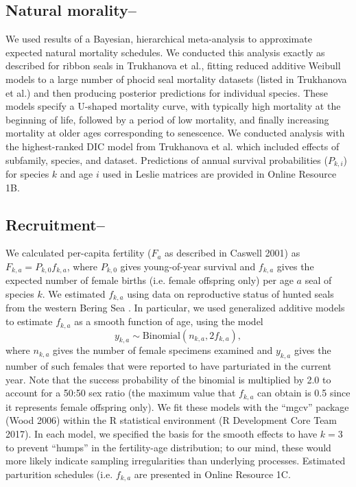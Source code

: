 \documentclass{svjour3}
\begin{document}
\subsection*{Natural morality--}
	We used results of a Bayesian, hierarchical meta-analysis \citep{TrukhanovaEtAl2018} to approximate expected natural mortality schedules.  We conducted this analysis exactly as described for ribbon seals in Trukhanova et al., fitting reduced additive Weibull models to a large number of phocid seal mortality datasets (listed in Trukhanova et al.) and then producing posterior predictions for individual species.  These models specify a U-shaped mortality curve, with typically high mortality at the beginning of life, followed by a period of low mortality, and finally increasing mortality at older ages corresponding to senescence.  We conducted analysis with the highest-ranked DIC model from Trukhanova et al. which included effects of subfamily, species, and dataset.  Predictions of annual survival probabilities ($P_{k,i}$) for species $k$ and age $i$ used in Leslie matrices are provided in Online Resource 1B.

\subsection*{Recruitment--}

We calculated per-capita fertility ($F_a$ as described in Caswell 2001) as  $F_{k,a}=P_{k,0} f_{k,a}$, where $P_{k,0}$ gives young-of-year survival and $f_{k,a}$ gives the expected number of female births (i.e. female offspring only) per age $a$ seal of species $k$.  We estimated $f_{k,a}$ using data on reproductive status of hunted seals from the western Bering Sea \citep[Tables 11, 24, 38, and 47 in][]{Fedoseev2000}. In particular, we used generalized additive models \citep{Wood2006} to estimate $f_{k,a}$ as a smooth function of age, using the model
\begin{equation*}
  y_{k,a} \sim \text{Binomial}(n_{k,a}, 2 f_{k,a}),
\end{equation*}
where $n_{k,a}$  gives the number of female specimens examined and $y_{k,a}$ gives the number of such females that were reported to have parturiated in the current year.  Note that the success probability of the binomial is multiplied by 2.0 to account for a 50:50 sex ratio (the maximum value that $f_{k,a}$ can obtain is 0.5 since it represents female offspring only). We fit these models with the “mgcv” package (Wood 2006) within the R statistical environment (R Development Core Team 2017).  In each model, we specified the basis for the smooth effects to have $k=3$ to prevent “humps” in the fertility-age distribution; to our mind, these would more likely indicate sampling irregularities than underlying processes.  Estimated parturition schedules (i.e. $f_{k,a}$ are presented in Online Resource 1C.
\end{document}
